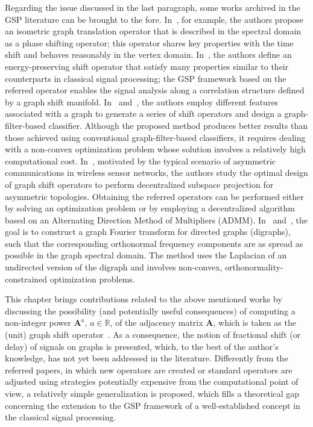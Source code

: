     {Regarding the issue discussed in the last paragraph, some works archived in the GSP literature can be brought to the fore. In~\parencite{girault2015translation}, for example, the authors propose an isometric graph translation operator that is described in the spectral domain as a phase shifting operator; this operator shares key properties with the time shift and behaves reasonably in the vertex domain. In~\parencite{gavili2017}, the authors define an energy-preserving shift operator that satisfy many properties similar to their counterparts in classical signal processing; the GSP framework based on the referred operator enables the signal analysis along a correlation structure defined by a graph shift manifold. In~\parencite{fan20191} and~\parencite{fan2019}, the authors employ different features associated with a graph to generate a series of shift operators and design a graph-filter-based classifier. Although the proposed method produces better results than those achieved using conventional graph-filter-based classifiers, it requires dealing with a non-convex optimization problem whose solution involves a relatively high computational cost. In~\parencite{mollaebrahim2021}, motivated by the typical scenario of asymmetric communications in wireless sensor networks, the authors study the optimal design of graph shift operators to perform decentralized subspace projection for asymmetric topologies. Obtaining the referred operators can be performed either by solving an optimization problem or by employing a decentralized algorithm based on an Alternating Direction Method of Multipliers (ADMM). In~\parencite{shafipour2018} and~\parencite{shafipour2019}, the goal is to construct a graph Fourier transform for directed graphs (digraphs), such that the corresponding orthonormal frequency components are as spread as possible in the graph spectral domain. The method uses the Laplacian of an undirected version of the digraph and involves non-convex, orthonormality-constrained optimization problems.}

    {This chapter brings contributions related to the above mentioned works by discussing the} possibility (and potentially useful consequences) of {computing} a non-integer power $\mathbf{A}^a$, $a\in\mathbb{R}$, of the adjacency matrix $\mathbf{A}$, {which is taken as} the (unit) graph shift operator~\parencite{sandryhaila2014big}. {As a consequence}, the notion of fractional shift (or delay) of signals on graphs is presented, {which, to the best of the author's knowledge, has not yet been addressed in the literature. Differently from the referred papers, in which new operators are created or standard operators are adjusted using strategies potentially expensive from the computational point of view, a relatively simple generalization is proposed, which fills a theoretical gap concerning the extension to the GSP framework of a well-established concept in the classical signal processing.}

